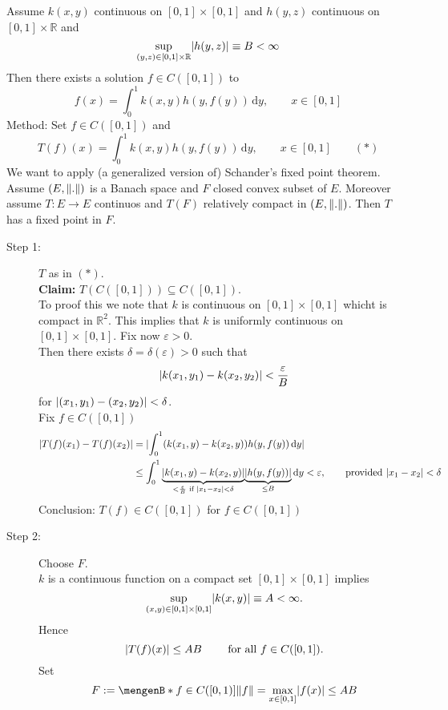 
\begin{beispiel}
	Assume $k(x,y)$ continuous on $[0,1] \times [0,1]$ and $h(y,z)$ continuous on $[0,1]\times \mathbb{R}$ and 
	\[
		\sup\limits_{(y,z) \in [0,1] \times \mathbb{R}} \lvert h(y,z)\rvert \equiv B < \infty
	\]
	Then there exists a solution $f \in C([0,1])$ to 
	\[
		f(x) = \int_{0}^{1} k(x,y)h(y,f(y)) \,\mathrm{d}y, \qquad x \in [0,1]
	\]
	Method: Set $f \in C([0,1])$ and
	\[
		T(f)(x) = \int_{0}^{1}k(x,y)h(y,f(y)) \,\mathrm{d}y, \qquad x \in [0,1] \qquad (*)
	\]
	We want to apply (a generalized version of) Schander's fixed point theorem. Assume $(E, \norm{.})$ is a Banach space and $F$ closed convex subset of $E$. Moreover assume $T: E \to E$ continuos and $T(F)$ relatively compact in $(E,\norm{.})$. Then $T$ has a fixed point in $F$. \\
	\begin{description}
		\item[Step 1:] $T$ as in $(*)$. \\
		\textbf{Claim:} \text{    }     $T(C([0,1])) \subseteq C([0,1])$. \\
		To proof this we note that $k$ is continuous on $[0,1] \times [0,1]$ whicht is compact in $\mathbb{R}^2$. This implies that $k$
 is uniformly continuous on $[0,1]\times [0,1]$. Fix now $\varepsilon >0$. \\
 Then there exists $\delta = \delta (\varepsilon) >0$ such that
 \[
 	\lvert k(x_1,y_1)- k(x_2,y_2)\rvert < \frac{\varepsilon}{B}
 \]
 for $\lvert(x_1,y_1)- (x_2,y_2)\rvert< \delta $. \\
 Fix $f \in C([0,1])$
 	\begin{align*}
 		\lvert T(f)(x_1)-T(f)(x_2)\rvert & = \lvert \int_{0}^{1}(k(x_1,y)-k(x_2,y))h(y,f(y)) \,\mathrm{d}y\rvert \\
		&\leq \int_{0}^{1}\underset{< \frac{\varepsilon}{B} \text{ if } \lvert x_1-x_2\rvert< \delta }{\underbrace{\lvert k(x_1,y)-k(x_2,y)\rvert}}\underset{\leq B}{\underbrace{\lvert h(y,f(y))\rvert}} \,\mathrm{d}y < \varepsilon, \qquad \text{provided }\lvert x_1-x_2\rvert< \delta
 	\end{align*}
	Conclusion: $T(f) \in C([0,1])$ for $f \in C([0,1])$
	\item[Step 2:] Choose $F$. \\
	$k$ is a continuous function on a compact set $[0,1] \times [0,1]$ implies
	\[
		\sup\limits_{(x,y) \in [0,1] \times [0,1]} \lvert k(x,y)\rvert \equiv A < \infty.
	\]
	Hence 
	\[
		\lvert T(f)(x)\rvert \leq  AB \qquad \text{ for all }f \in C([0,1]).
	\]
	Set 
	\[
		F:= \set[f \in C([0,1])]{\norm{f} = \max_{x \in [0,1]}\abs{f(x)} \leq AB}
\]
\end{description}
\end{beispiel}
